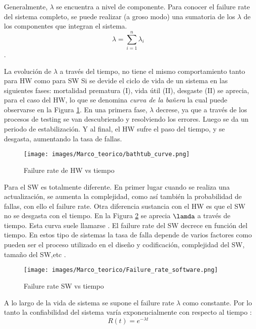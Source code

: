 Generalmente, $\lambda$ se encuentra a nivel de componente. Para conocer el failure rate del
sistema completo, se puede realizar (a groso modo) una sumatoria de los $\lambda$ de los
componentes que integran el sistema. $$\lambda=\sum_{i=1}^{n} \lambda_i$$.

La evolución de $\lambda$ a través del tiempo, no tiene el mismo comportamiento tanto para \ac{HW} como para \ac{SW}
Si se devide el ciclo de vida de un sistema en las siguientes fases: mortalidad prematura (I), vida útil (II), desgaste (II) \citep{FTDesign}
se aprecia, para el caso del \ac{HW}, lo que se denomina \textit{curva de la bañera} la cual puede observarse en la Figura \ref{fig:bathtub_curve}.
En una primera fase, $\lambda$ decrese, ya que a través de los procesos de testing se van descubriendo y resolviendo los errores. Luego se da un periodo de estabilización.
Y al final, el \ac{HW} sufre el paso del tiempo, y se desgasta, aumentando la tasa de fallas.

\begin{figure}[h]
 \centering
 \texttt{[image: images/Marco\_teorico/bathtub\_curve.png]}
  \caption{Failure rate de HW vs tiempo }
\label{fig:bathtub_curve}
\end{figure}

Para el \ac{SW} es totalmente diferente. En primer lugar cuando se realiza una actualización, se aumenta la complejidad, como así también la probabilidad de fallas,
con ello el failure rate. Otra diferencia sustancia con el \ac{HW} es que el \ac{SW} no se desgasta con el tiempo. En la Figura \ref{fig:Failure_rate_software}
se aprecia $\lamda$ a través de tiempo. Esta curva suele llamarse . El failure rate del \ac{SW} decrece en función del tiempo. En estos tipo de sistemas
la tasa de falla depende de varios factores como pueden ser el proceso utilizado en el diseño y codificación, complejidad del \ac{SW}, tamaño del \ac{SW},etc \citep{FTDesign}.

\begin{figure}[h]
 \centering
 \texttt{[image: images/Marco\_teorico/Failure\_rate\_software.png]}
  \caption{Failure rate SW vs tiempo }
\label{fig:Failure_rate_software}
\end{figure}

A lo largo de la vida de sistema se supone el failure rate $\lambda$ como constante. Por lo tanto la confiabilidad del sistema varía exponencialmente
con respecto al tiempo \citep{FTDesign}: $$R(t) = e^{- \lambda t}$$

